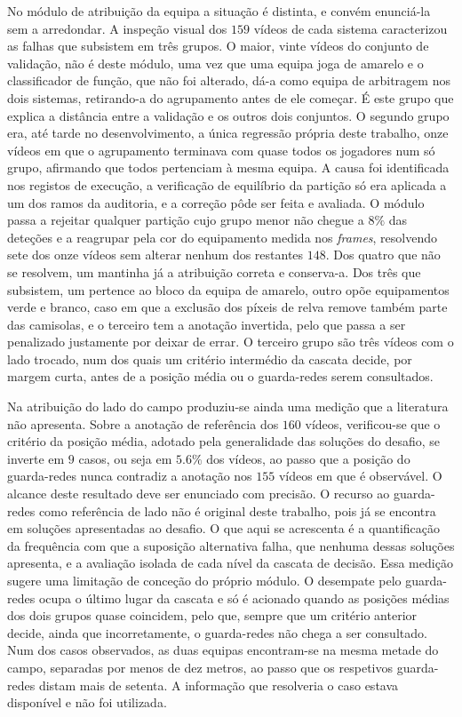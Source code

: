 No módulo de atribuição da equipa a situação é distinta, e convém enunciá-la sem a arredondar. A
inspeção visual dos $159$ vídeos de cada sistema caracterizou as falhas que subsistem em três
grupos. O maior, vinte vídeos do conjunto de validação, não é deste módulo, uma vez que uma equipa joga de
amarelo e o classificador de função, que não foi alterado, dá-a como equipa de arbitragem nos dois
sistemas, retirando-a do agrupamento antes de ele começar. É este grupo que explica a distância
entre a validação e os outros dois conjuntos. O segundo grupo era, até tarde no
desenvolvimento, a única regressão própria deste trabalho, onze vídeos em que o agrupamento terminava
com quase todos os jogadores num só grupo, afirmando que todos pertenciam à mesma equipa. A causa
foi identificada nos registos de execução, a verificação de equilíbrio da partição só era aplicada a
um dos ramos da auditoria, e a correção pôde ser feita e avaliada. O módulo passa a rejeitar
qualquer partição cujo grupo menor não chegue a $8\%$ das deteções e a reagrupar pela cor do
equipamento medida nos \emph{frames}, resolvendo sete dos onze vídeos sem alterar nenhum dos
restantes $148$. Dos quatro que não se resolvem, um mantinha já a atribuição correta e conserva-a.
Dos três que subsistem, um pertence ao bloco da equipa de amarelo, outro opõe
equipamentos verde e branco, caso em que a exclusão dos píxeis de relva remove também parte das
camisolas, e o terceiro tem a anotação invertida, pelo que passa a ser penalizado justamente por
deixar de errar. O terceiro grupo são três vídeos com o lado trocado, num dos quais um critério
intermédio da cascata decide, por margem curta, antes de a posição média ou o guarda-redes serem
consultados.

Na atribuição do lado do campo produziu-se ainda uma medição que a literatura não apresenta. Sobre a
anotação de referência dos $160$ vídeos, verificou-se que o critério da posição média, adotado pela
generalidade das soluções do desafio, se inverte em $9$ casos, ou seja em $5.6\%$ dos vídeos, ao
passo que a posição do guarda-redes nunca contradiz a anotação nos $155$ vídeos em que é observável.
O alcance deste resultado deve ser enunciado com precisão. O recurso ao guarda-redes como
referência de lado não é original deste trabalho, pois já se encontra em soluções apresentadas ao
desafio. O que aqui se acrescenta é a quantificação da frequência com que a suposição alternativa
falha, que nenhuma dessas soluções apresenta, e a avaliação isolada de cada nível da cascata de
decisão. Essa medição sugere uma limitação de conceção do próprio módulo. O desempate pelo
guarda-redes ocupa o último lugar da cascata e só é acionado quando as posições médias dos dois
grupos quase coincidem, pelo que, sempre que um critério anterior decide, ainda que incorretamente,
o guarda-redes não chega a ser consultado. Num dos casos observados, as duas equipas encontram-se
na mesma metade do campo, separadas por menos de dez metros, ao passo que os respetivos
guarda-redes distam mais de setenta. A informação que resolveria o caso estava disponível e não foi
utilizada.

